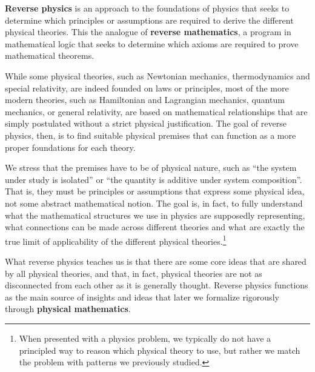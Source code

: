 \textbf{Reverse physics} is an approach to the foundations of physics that seeks to determine which principles or assumptions are required to derive the different physical theories. This the analogue of \textbf{reverse mathematics}, a program in mathematical logic that seeks to determine which axioms are required to prove mathematical theorems.

While some physical theories, such as Newtonian mechanics, thermodynamics and special relativity, are indeed founded on laws or principles, most of the more modern theories, such as Hamiltonian and Lagrangian mechanics, quantum mechanics, or general relativity, are based on mathematical relationships that are simply postulated without a strict physical justification. The goal of reverse physics, then, is to find suitable physical premises that can function as a more proper foundations for each theory.

We stress that the premises have to be of physical nature, such as ``the system under study is isolated'' or ``the quantity is additive under system composition''. That is, they must be principles or assumptions that express some physical idea, not some abstract mathematical notion. The goal is, in fact, to fully understand what the mathematical structures we use in physics are supposedly representing, what connections can be made across different theories and what are exactly the true limit of applicability of the different physical theories.\footnote{When presented with a physics problem, we typically do not have a principled way to reason which physical theory to use, but rather we match the problem with patterns we previously studied.}

What reverse physics teaches us is that there are some core ideas that are shared by all physical theories, and that, in fact, physical theories are not as disconnected from each other as it is generally thought. Reverse physics functions as the main source of insights and ideas that later we formalize rigorously through \textbf{physical mathematics}.
